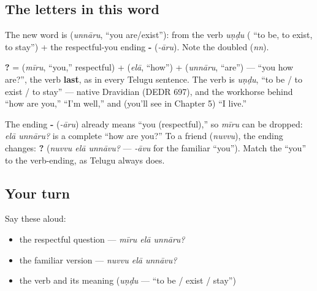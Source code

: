 \subsection*{The letters in this word}
The new word is \textbf{} (\emph{unnāru}, \textquotedblleft{}you are/exist\textquotedblright{}): from the verb \emph{uṇḍu} ( \textquotedblleft{}to be, to exist, to stay\textquotedblright{}) + the respectful-you ending \textbf{-} (\emph{-āru}). Note the doubled \textbf{} (\emph{nn}).

\begin{cousinweb}
\textbf{  ?} = \textbf{} (\emph{mīru}, \textquotedblleft{}you,\textquotedblright{} respectful) + \textbf{} (\emph{elā}, \textquotedblleft{}how\textquotedblright{}) + \textbf{} (\emph{unnāru}, \textquotedblleft{}are\textquotedblright{}) — \textquotedblleft{}you how are?\textquotedblright{}, the verb \textbf{last}, as in every Telugu sentence. The verb is \emph{uṇḍu}, \textquotedblleft{}to be / to exist / to stay\textquotedblright{} — native Dravidian (DEDR 697), and the workhorse behind \textquotedblleft{}how are you,\textquotedblright{} \textquotedblleft{}I'm well,\textquotedblright{} and (you'll see in Chapter 5) \textquotedblleft{}I live.\textquotedblright{}
\end{cousinweb}

\begin{grammarlens}[title={Grammar Lens: the verb carries \textquotedblleft{}you\textquotedblright{}}]
The ending \textbf{-} (\emph{-āru}) already means \textquotedblleft{}you (respectful),\textquotedblright{} so \emph{mīru} can be dropped: \emph{elā unnāru?} is a complete \textquotedblleft{}how are you?\textquotedblright{} To a friend (\emph{nuvvu}), the ending changes: \textbf{  ?} (\emph{nuvvu elā unnāvu?} — \emph{-āvu} for the familiar \textquotedblleft{}you\textquotedblright{}). Match the \textquotedblleft{}you\textquotedblright{} to the verb-ending, as Telugu always does.
\end{grammarlens}

\subsection*{Your turn}
Say these aloud:

\begin{itemize}
\raggedright
  \item the respectful question — \emph{mīru elā unnāru?}
  \item the familiar version — \emph{nuvvu elā unnāvu?}
  \item the verb and its meaning (\emph{uṇḍu} — \textquotedblleft{}to be / exist / stay\textquotedblright{})
\end{itemize}

